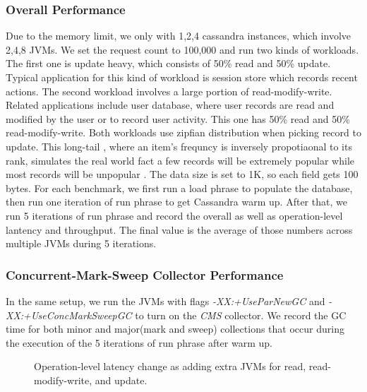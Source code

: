 \documentclass{sig-alternate}
\begin{document}
\subsubsection{Overall Performance}
Due to the memory limit, we only with 1,2,4 cassandra instances, which involve 2,4,8 JVMs. We set the request count to 100,000 and run two kinds of workloads. The first one is update heavy, which consists of 50\% read and 50\% update. Typical application for this kind of workload is session store which records recent actions. The second workload involves a large portion of read-modify-write. Related applications include user database, where user records are read and modified by the user or to record user activity. This one has 50\% read and 50\% read-modify-write. Both workloads use zipfian distribution when picking record to update. This long-tail , where an item's frequncy is inversely propotiaonal to its rank, simulates the real world fact a few records will be extremely popular while most records will be unpopular \cite{adamic2002zipf}. The data size is set to 1K, so each field gets 100 bytes. For each benchmark, we first run a load phrase to populate the database, then run one iteration of run phrase to get Cassandra warm up. After that, we run 5 iterations of run phrase and record the overall as well as operation-level lantency and throughput. The final value is the average of those numbers across multiple JVMs during 5 iterations.

\subsubsection{Concurrent-Mark-Sweep Collector Performance}
In the same setup, we run the JVMs with flags \textit{-XX:+UseParNewGC} and \textit{-XX:+UseConcMarkSweepGC} to turn on the \textit{CMS} collector. We record the GC time for both minor and major(mark and sweep) collections that occur during the execution of the 5 iterations of run phrase after warm up.

\begin{figure*}

\centering
{}
\caption{Operation-level latency change as adding extra JVMs for read, read-modify-write, and update.}
\label{fig:cassandraresults}
\end{figure*}
\end{document}
